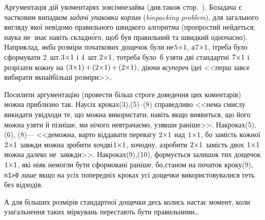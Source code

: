 \documentclass[14pt,a4paper]{extarticle}
\def\dib#1{\,#1\discretionary{}{\mbox{$#1$}}{}\,}
\begin{document}
Аргументація дій у\nolinebreak[3] коментарях зовсім\nolinebreak[1] не\nolinebreak[3] зайва
(див.\nolinebreak[2] також стор.~\pageref{text:need-or-no-need-to-prove}). Бо\nolinebreak[3] задача є частковим випадком \emph{задачі упаковки корзин} (\emph{bin\nolinebreak[1] packing problem}), для загального вигляду якої не\nolinebreak[3] відомо правильного швидкого алгоритма (про\nolinebreak[1] простий не\nolinebreak[3] йдеться; наука не~знає навіть складн\'{о}го, щоб був правильний та швидкий одночасно). Наприклад, \emph{якби} розміри початкових дощечок були не\nolinebreak[3] $5{\times}1$, а\nolinebreak[3] $7{\times}1$, і\nolinebreak[3] треба було сформувати 2~шт.\nolinebreak[3] $3{\times}1$ і 4~шт.\nolinebreak[3] $2{\times}1$, то\nolinebreak[3] треба було~б узяти дві стандартні $7{\times}1$ і розрізати кожну на $(3{\*}1)\dib{{+}}(2{\*}1)\dib{{+}}(2{\*}1)$, діючи \emph{всупереч} ідеї <<перш за\nolinebreak[3] все вибирати якнайбільші розміри>>.

Посилити аргументацію (провести більш строге доведення цих коментарів) можна приблизно так. На\nolinebreak[2] усіх кроках\nolinebreak[2] (3),\nolinebreak[1] \mbox{(5)--(8)} справедливо <<нема смислу викидати у\nolinebreak[3] відходи те, що можна використати; навіть якщо виявиться, що його можна узяти й пізніше, ми нічого не\nolinebreak[3] втрачаємо, узявши раніше>>. 
\label{text:proof-example-parket-1}
На\nolinebreak[3] кроках\nolinebreak[3] (5), \nolinebreak[1] (6), \nolinebreak[1] (8)\nolinebreak[3] --- <<де\nolinebreak[3] можна, варто віддавати перевагу $2{\times}1$ над $1{\times}1$, бо замість кожної $2{\times}1$ завжди можна зробити хоч\nolinebreak[1] дві\nolinebreak[3] $1{\times}1$, хоч\nolinebreak[1] одну, а\nolinebreak[3] зробити $2{\times}1$ замість двох $1{\times}1$ можна далеко не~завжди>>. На\nolinebreak[3] кроках\nolinebreak[2] (9),\nolinebreak[3] (10), формується залишок тих дощечок\nolinebreak[3] $1{\times}1$, які ніяк не\nolinebreak[3] могли бути сформовані раніше, бо,\nolinebreak[2] станом на початок кроку\nolinebreak[3] (9), \verb"n1>0" \emph{лише} якщо на усіх попередніх кроках усі дощечки використовувалися геть без відходів.

А для більших розмірів стандартної дощечки десь колись настає момент, коли узагальнення таких міркувань перестають бути правильними\dots
\end{document}
